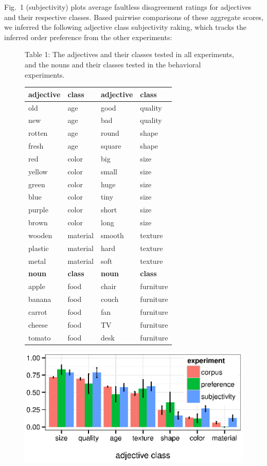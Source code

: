 \documentclass[12pt]{article}
\begin{document}
Fig.~1 (subjectivity) plots average faultless disagreement ratings for adjectives and their respective classes. Based pairwise comparisons of these aggregate scores, we inferred the following adjective class subjectivity raking, which tracks the inferred order preference from the other experiments:
\begin{figure}
	Table 1: The adjectives and their classes tested in all experiments, and the nouns and their classes tested in the behavioral experiments. \\
	{\footnotesize \begin{tabular}{llll}
		\textbf{adjective}	&	\textbf{class}	&	\textbf{adjective}	&	\textbf{class}	\\ \hline
		old	&	age	&	good	&	quality	\\
		new	&	age	&	bad	&	quality	\\
		rotten	&	age	&	round	&	shape	\\
		fresh	&	age	&	square	&	shape	\\
		red	&	color	&	big	&	size	\\
		yellow	&	color	&	small	&	size	\\
		green	&	color	&	huge	&	size	\\
		blue	&	color	&	tiny	&	size	\\
		purple	&	color	&	short	&	size	\\
		brown	&	color	&	long	&	size	\\
		wooden	&	material	&	smooth	&	texture	\\
		plastic	&	material	&	hard	&	texture	\\
		metal	&	material	&	soft	&	texture	\\
		\textbf{noun}	&	\textbf{class}	&	\textbf{noun}	&	\textbf{class}	\\ \hline
		apple	&	food	&	chair	&	furniture	\\
		banana	&	food	&	couch	&	furniture	\\
		carrot	&	food	&	fan	&	furniture	\\
		cheese	&	food	&	TV	&	furniture	\\
		tomato	&	food	&	desk	&	furniture	
	\end{tabular}}
	\vspace{-15pt}
	\begin{center}
		\includegraphics[width=.95\linewidth]{plots/expt_results.eps}

\end{center}
\end{figure}
\end{document}
